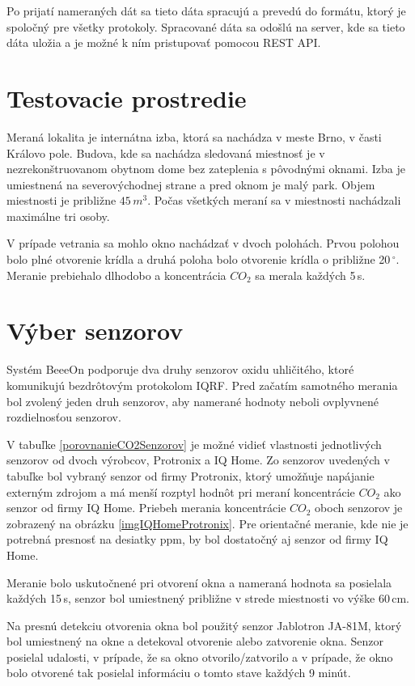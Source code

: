Po prijatí nameraných dát sa tieto dáta spracujú a prevedú do formátu, ktorý je spoločný pre všetky protokoly. Spracované dáta sa odošlú na server, kde sa tieto dáta uložia a je možné k ním pristupovať pomocou REST API.

\section{Testovacie prostredie}\label{testovacieProstredie}
Meraná lokalita je internátna izba, ktorá sa nachádza v meste Brno, v časti Královo pole. Budova, kde sa nachádza sledovaná miestnosť je v nezrekonštruovanom obytnom dome bez zateplenia s pôvodnými oknami. Izba je umiestnená na severovýchodnej strane a pred oknom je malý park. Objem miestnosti je približne $45\,m^3$. Počas všetkých meraní sa v miestnosti nachádzali maximálne tri osoby. 

V prípade vetrania sa mohlo okno nachádzať v dvoch polohách. Prvou polohou bolo plné otvorenie krídla a druhá poloha bolo otvorenie krídla o približne 20\,$^\circ$. Meranie prebiehalo dlhodobo a koncentrácia $CO_2$ sa merala každých 5\,s.

\section{Výber senzorov}
Systém BeeeOn podporuje dva druhy senzorov oxidu uhličitého, ktoré komunikujú bezdrôtovým protokolom IQRF. Pred začatím samotného merania bol zvolený jeden druh senzorov, aby namerané hodnoty neboli ovplyvnené rozdielnosťou senzorov. 

V tabuľke \ref{porovnanieCO2Senzorov} je možné vidieť vlastnosti jednotlivých senzorov od dvoch výrobcov, Protronix a IQ Home. Zo senzorov uvedených v tabuľke bol vybraný senzor od firmy Protronix, ktorý umožňuje napájanie externým zdrojom a má menší rozptyl hodnôt pri meraní koncentrácie $CO_2$ ako senzor od firmy IQ Home. Priebeh merania koncentrácie $CO_2$ oboch senzorov je zobrazený na obrázku \ref{imgIQHomeProtronix}. Pre orientačné meranie, kde nie je potrebná presnosť na desiatky ppm, by bol dostatočný aj senzor od firmy IQ Home.

Meranie bolo uskutočnené pri otvorení okna a nameraná hodnota sa posielala každých 15\,s, senzor bol umiestnený približne v strede miestnosti vo výške 60\,cm.

Na presnú detekciu otvorenia okna bol použitý senzor Jablotron JA-81M, ktorý bol umiestnený na okne a detekoval otvorenie alebo zatvorenie okna. Senzor posielal udalosti, v prípade, že sa okno otvorilo/zatvorilo a v prípade, že okno bolo otvorené tak posielal informáciu o tomto stave každých 9 minút.

